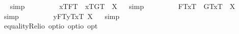 \begin{isabellebody}
\isadelimproof
\ %
\endisadelimproof
%
\isatagproof
{}\isamarkupfalse%
\ simp\ \isamarkupfalse%
\ %
%
\endisatagproof
{\isafoldproof}%
%
\isadelimproof
%
\endisadelimproof
\ \ \ \isanewline
\ \isamarkupfalse%
\ {\isachardoublequoteopen}{\isasymlbrace}x\isactrlsup T{\isacharcomma}F{}\isactrlsup T{\isasymrbrace}\ \isactrlbold {\isasymequiv}\ {\isasymlbrace}x\isactrlsup T{\isacharcomma}G{}\isactrlsup T{\isasymrbrace}\ {\isacharequal}\ X{\isachardoublequoteclose}%
\isadelimproof
\ %
\endisadelimproof
%
\isatagproof
{}\isamarkupfalse%
\ simp\ \isamarkupfalse%
\ %
%
\endisatagproof
{\isafoldproof}%
%
\isadelimproof
%
\endisadelimproof
\ \ \ \isanewline
\ \isamarkupfalse%
\ {\isachardoublequoteopen}{\isasymlparr}F{}\isactrlsup T{\isacharcomma}x\isactrlsup T{\isasymrparr}\ \isactrlbold {\isasymequiv}\ {\isasymlparr}G{}\isactrlsup T{\isacharcomma}x\isactrlsup T{\isasymrparr}\ {\isacharequal}\ X{\isachardoublequoteclose}%
\isadelimproof
\ %
\endisadelimproof
%
\isatagproof
{}\isamarkupfalse%
\ simp\ \isamarkupfalse%
\ %
%
\endisatagproof
{\isafoldproof}%
%
\isadelimproof
%
\endisadelimproof
\ \ \ \isanewline
\ \isamarkupfalse%
\ {\isachardoublequoteopen}{\isacharparenleft}\isactrlbold {\isasymlambda}y{\isachardot}{\isasymlparr}F{}\isactrlsup T{\isacharcomma}y\isactrlsup T{\isacharcomma}x{}\isactrlsup T{\isasymrparr}{\isacharparenright}{\isacharequal}\ X{\isachardoublequoteclose}%
\isadelimproof
\ %
\endisadelimproof
%
\isatagproof
{}\isamarkupfalse%
\ simp\ \isamarkupfalse%
\ %
%
\endisatagproof
{\isafoldproof}%
%
\isadelimproof
%
\endisadelimproof
\ \ \isanewline
\isanewline
\ \isamarkupfalse%
\ equalityRel{}{\isacharcolon}{\isacharcolon}{\isachardoublequoteopen}io\ opt{\isasymRightarrow}io\ opt{\isasymRightarrow}io\ opt{\isachardoublequoteclose}\ {\isacharparenleft}\ {\isachardoublequoteopen}\isactrlbold {\isacharequal}\ {}{}{\isacharparenright}\ \isanewline

\end{isabellebody}
